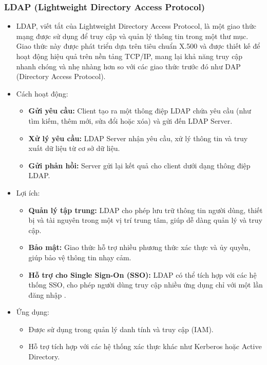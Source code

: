 \subsubsection{LDAP (Lightweight Directory Access Protocol)
}
\begin{itemize}
    \item LDAP, viết tắt của Lightweight Directory Access Protocol, là một giao thức mạng được sử dụng để truy cập và quản lý thông tin trong một thư mục. Giao thức này được phát triển dựa trên tiêu chuẩn X.500 và được thiết kế để hoạt động hiệu quả trên nền tảng TCP/IP, mang lại khả năng truy cập nhanh chóng và nhẹ nhàng hơn so với các giao thức trước đó như DAP (Directory Access Protocol).

    \item Cách hoạt động:
    \begin{itemize}
        \item \textbf{Gửi yêu cầu:} Client tạo ra một thông điệp LDAP chứa yêu cầu (như tìm kiếm, thêm mới, sửa đổi hoặc xóa) và gửi đến LDAP Server.
        \item \textbf{Xử lý yêu cầu:} LDAP Server nhận yêu cầu, xử lý thông tin và truy xuất dữ liệu từ cơ sở dữ liệu.

        \item \textbf{Gửi phản hồi:} Server gửi lại kết quả cho client dưới dạng thông điệp LDAP.

    \end{itemize}
    \item Lợi ích:
    \begin{itemize}
        \item \textbf{Quản lý tập trung:} LDAP cho phép lưu trữ thông tin người dùng, thiết bị và tài nguyên trong một vị trí trung tâm, giúp dễ dàng quản lý và truy cập.

        \item \textbf{Bảo mật:} Giao thức hỗ trợ nhiều phương thức xác thực và ủy quyền, giúp bảo vệ thông tin nhạy cảm.

        \item \textbf{Hỗ trợ cho Single Sign-On (SSO):} LDAP có thể tích hợp với các hệ thống SSO, cho phép người dùng truy cập nhiều ứng dụng chỉ với một lần đăng nhập .

    \end{itemize}
    \item Ứng dụng:
    \begin{itemize}
        \item Được sử dụng trong quản lý danh tính và truy cập (IAM).
        \item Hỗ trợ tích hợp với các hệ thống xác thực khác như Kerberos hoặc Active Directory.
    \end{itemize}
\end{itemize}

